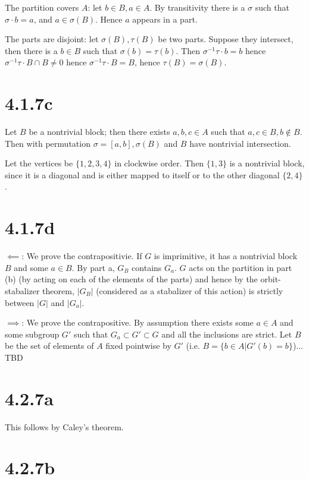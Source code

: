 \documentclass{article}
\def\inv{{-1}}
\begin{document}
The partition covers $A$: let $b \in B, a \in A$. By transitivity there is a $\sigma$ such that $\sigma \cdot b = a$, and $a \in \sigma (B)$. Hence $a$ appears in a part.

The parts are disjoint: let $\sigma(B), \tau(B)$ be two parts. Suppose they intersect, then there is a $b \in B$ such that $\sigma(b) = \tau(b)$. Then $\sigma^\inv \tau \cdot b = b$ hence $\sigma^\inv \tau \cdot B \cap B \ne 0$ hence $\sigma^\inv \tau \cdot B = B$, hence $\tau(B) = \sigma(B)$.

\section*{4.1.7c}

Let $B$ be a nontrivial block; then there exists $a, b, c \in A$ such that $a, c \in B, b \not\in B$. Then with permutation $\sigma = [a, b], \sigma(B)$ and $B$ have nontrivial intersection.

Let the vertices be $\{1, 2, 3, 4\}$ in clockwise order. Then $\{1, 3\}$ is a nontrivial block, since it is a diagonal and is either mapped to itself or to the other diagonal $\{2, 4\}$.

\section*{4.1.7d}

$\impliedby$: We prove the contrapositivie. If $G$ is imprimitive, it has a nontrivial block $B$ and some $a \in B$. By part a, $G_B$ contains $G_a$. $G$ acts on the partition in part (b) (by acting on each of the elements of the parts) and hence by the orbit-stabalizer theorem, $|G_B|$ (considered as a stabalizer of this action) is strictly between $|G|$ and $|G_a|$.

$\implies$: We prove the contrapositive. By assumption there exists some $a \in A$ and some subgroup $G'$ such that $G_a \subset G' \subset G$ and all the inclusions are strict. Let $B$ be the set of elements of $A$ fixed pointwise by $G'$ (i.e. $B = \{b \in A | G'(b) = b\}$)... TBD

\section*{4.2.7a}

This follows by Caley's theorem.

\section*{4.2.7b}
\end{document}
